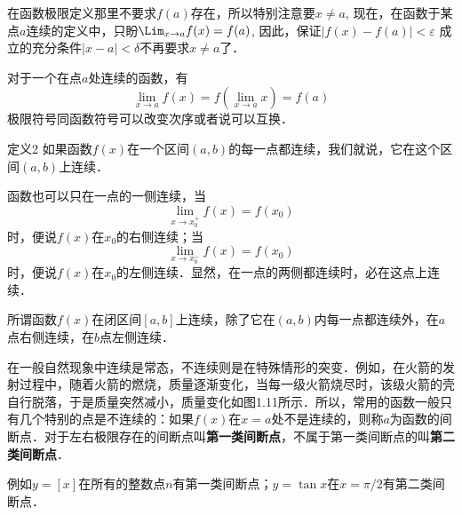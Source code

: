 \begin{rmk}
在函数极限定义那里不要求$f(a)$存在，所以特别注意要$x\ne a$, 现在，在函数于某点$a$连续的定义中，只盼$\Lim_{x\to a} f(x)=f(a)$, 因此，保证$|f(x)-f(a)|<\varepsilon$
成立的充分条件$|x-a|<\delta$不再要求$x\ne a$了．
\end{rmk}

对于一个在点$a$处连续的函数，有
\[\lim_{x\to a}f (x) =f \left(\lim_{x\to a} x\right) =f (a)\]  
极限符号同函数符号可以改变次序或者说可以互换．

\begin{blk}
 {定义2 }如果函数$f(x)$在一个区间$(a,b)$的每一点都连续，我们就说，它在这个区间$(a,b)$上连续．   
\end{blk}

函数也可以只在一点的一侧连续，当
\[\lim_{x\to x_0^+} f (x) =f (x_0)\]
时，便说$f(x)$在$x_0$的右侧连续；当
\[\lim_{x\to x_0^-} f (x) =f (x_0)\]
时，便说$f(x)$在$x_0$的左侧连续．显然，在一点的两侧都连续时，必在这点上连续．

所谓函数$f(x)$在闭区间$[a,b]$上连续，除了它在$(a,b)$内每一点都连续外，在$a$点右侧连续，在$b$点左侧连续．

在一般自然现象中连续是常态，不连续则是在特殊情形的突变．例如，在火箭的发射过程中，随着火箭的燃烧，质量逐渐变化，当每一级火箭烧尽时，该级火箭的壳自行脱落，于是质量突然减小，质量变化如图1.11所示．所以，常用的函数一般只有几个特别的点是不连续的：如果$f(x)$在$x=a$处不是连续的，则称$a$为函数的间断点．对于左右极限存在的间断点叫\textbf{第一类间断点}，不属于第一类间断点的叫\textbf{第二类间断点}．

例如$y=[x]$在所有的整数点$n$有第一类间断点；$y=\tan x$在$x=\pi/2$有第二类间断点．

\begin{figure}[htp]
    \centering
    \begin{minipage}[t]{0.48\textwidth}
    \centering
    \caption{}
    \end{minipage}
    \begin{minipage}[t]{0.48\textwidth}
    \centering
    \caption{}
    \end{minipage}
    \end{figure}

